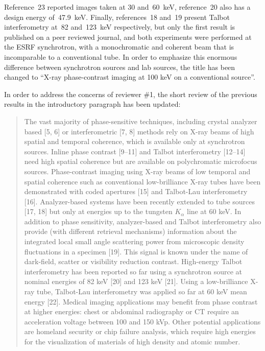 \documentclass[a4paper,english]{scrartcl}
\begin{document}
Reference~23 reported images taken at \num{30} and~\SI{60}{\kilo\eV},
reference~20 also has a design energy of~\SI{47.9}{\kilo\eV}. Finally,
references~18 and~19 present Talbot interferometry at~\num{82}
and~\SI{123}{\kilo\eV} respectively, but only the first result is published
on a peer reviewed journal, and both experiments were performed at the ESRF
synchrotron, with a monochromatic and coherent beam that is incomparable to
a conventional tube.
In order to emphasize this enormous difference between synchrotron sources
and lab sources, the title has been changed to ``X-ray phase-contrast imaging at
100 keV on
a conventional source''.

In order to address the concerns of reviewer \#1, the short review of the
previous results in the
introductory paragraph has been updated:
\begin{quote}
The vast majority of phase-sensitive techniques, including crystal analyzer based [5, 6] or
interferometric [7, 8] methods rely on X-ray beams of high spatial and temporal coherence,
which is available only at synchrotron sources. Inline phase contrast [9–11] and Talbot interferometry [12–14] need high spatial coherence but are available on polychromatic microfocus
sources. Phase-contrast imaging using X-ray beams of low temporal and spatial coherence
such as conventional low-brilliance X-ray tubes have been demonstrated with coded apertures [15] and Talbot-Lau interferometry [16]. Analyzer-based systems have been recently
extended to tube sources [17, 18] but only at energies up to the tungsten
$K_\alpha$ line at 60 keV. In
addition to phase sensitivity, analyzer-based and Talbot interferometry also provide (with different retrieval mechanisms) information about the integrated
local small angle scattering power from microscopic density fluctuations in a specimen [19].
This signal is known under the name of dark-field, scatter or visibility reduction contrast.
High-energy Talbot interferometry has been reported so far using a synchrotron source
at nominal energies of 82 keV [20] and 123 keV [21]. Using a low-brilliance X-ray tube,
Talbot-Lau interferometry was applied so far at 60 keV mean energy [22]. Medical imaging
applications may benefit from phase contrast at higher energies: chest or abdominal radiography or CT require an acceleration voltage between 100 and 150 kVp. Other potential applications are
homeland security or chip failure analysis, which require high energies for the visualization
of materials of high density and atomic number.
\end{quote}
\end{document}
